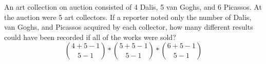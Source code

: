 \item An art collection on auction consisted of 4 Dalis, 5 van Goghs, and 6 Picassos. At the auction were 5 art collectors. If a reporter noted only the number of Dalis, van Goghs, and Picassos acquired by each collector, how many different results could have been recorded if all of the works were sold?
\[ \binom{4+5-1}{5-1} * \binom{5+5-1}{5-1} * \binom{6+5-1}{5-1} \]